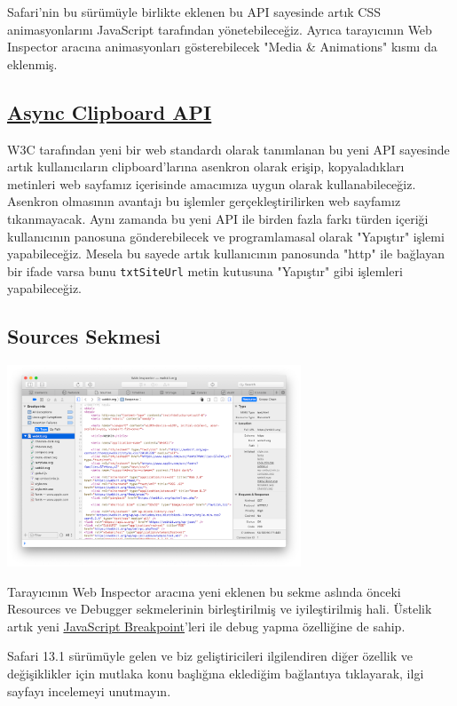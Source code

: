 \documentclass[11pt]{article}
\begin{document}
Safari'nin bu sürümüyle birlikte eklenen bu API sayesinde artık CSS
animasyonlarını JavaScript tarafından yönetebileceğiz. Ayrıca tarayıcının Web
Inspector aracına animasyonları gösterebilecek "Media \& Animations" kısmı da
eklenmiş.
\subsection{\href{https://w3c.github.io/clipboard-apis/\#async-clipboard-api}{Async Clipboard API}}
\label{sec:org865f255}
W3C tarafından yeni bir web standardı olarak tanımlanan bu yeni API sayesinde
artık kullanıcıların clipboard'larına asenkron olarak erişip, kopyaladıkları
metinleri web sayfamız içerisinde amacımıza uygun olarak kullanabileceğiz.
Asenkron olmasının avantajı bu işlemler gerçekleştirilirken web sayfamız
tıkanmayacak. Aynı zamanda bu yeni API ile birden fazla farkı türden içeriği
kullanıcının panosuna gönderebilecek ve programlamasal olarak "Yapıştır"
işlemi yapabileceğiz. Mesela bu sayede artık kullanıcının panosunda "http"
ile bağlayan bir ifade varsa bunu \texttt{txtSiteUrl} metin kutusuna "Yapıştır" gibi
işlemleri yapabileceğiz.
\subsection{Sources Sekmesi}
\label{sec:org73d533f}
\begin{center}
\includegraphics[height=6cm]{gorseller/safari13-sources-tab.png}
\end{center}

Tarayıcının Web Inspector aracına yeni eklenen bu sekme aslında önceki
Resources ve Debugger sekmelerinin birleştirilmiş ve iyileştirilmiş hali.
Üstelik artık yeni \href{https://webkit.org/web-inspector/javascript-breakpoints/}{JavaScript Breakpoint}'leri ile debug yapma özelliğine de
sahip.

Safari 13.1 sürümüyle gelen ve biz geliştiricileri ilgilendiren diğer özellik
ve değişiklikler için mutlaka konu başlığına eklediğim bağlantıya tıklayarak,
ilgi sayfayı incelemeyi unutmayın.
\end{document}
